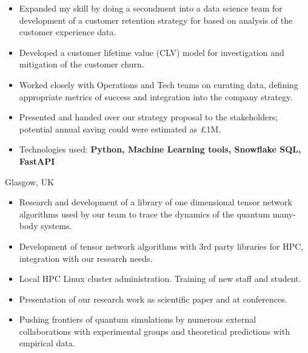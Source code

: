 \documentclass[10pt,a4paper,ragged2e,withhyper]{altacv}
\begin{document}
\begin{paracol}{2}
\begin{itemize}

    \item
    Expanded my skill by doing a secondment into a data science team for
    development of a customer retention strategy for based on analysis of the
    customer experience data.
    
    \item
    Developed a customer lifetime value (CLV) model for investigation and
    mitigation of the customer churn.

    \item
    Worked closely with Operations and Tech teams on curating data,
    defining appropriate metrics of success and integration into the company
    strategy.

    \item
    Presented and handed over our strategy proposal to the stakeholders; 
    potential annual saving could were estimated as £1M.

    \item
    Technologies used: 
    {\bf Python, Machine Learning tools, Snowflake SQL, FastAPI}

\end{itemize}

\divider

{Glasgow, UK}

\begin{itemize}

    \item
    Research and development of a library of one dimensional tensor network
    algorithms used by our team to trace the dynamics of the quantum many-body
    systems.

    \item
    Development of tensor network algorithms with 3rd party libraries for HPC,
    integration with our research needs.

    \item
    Local HPC Linux cluster administration. Training of new staff and student.

    \item
    Presentation of our research work as scientific paper and at conferences.
    
    \item
    Pushing frontiers of quantum simulations by numerous external collaborations
    with experimental groups and theoretical predictions with empirical data.


\end{itemize}
\end{paracol}
\end{document}
